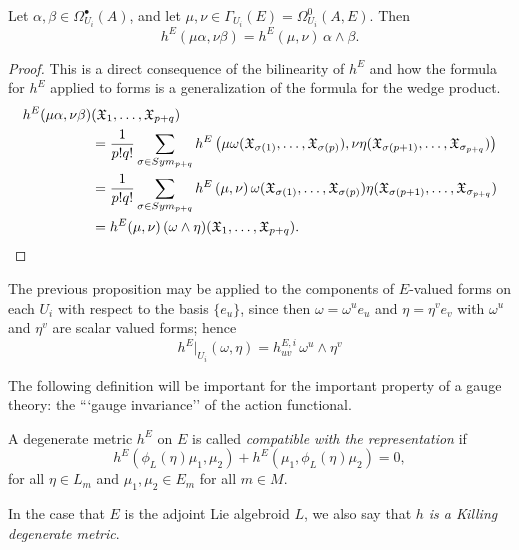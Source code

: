 \begin{proposition}
Let $\alpha, \beta \in \Omega_{U_i}^\bullet(A)$, and let $\mu, \nu \in \Gamma_{U_i}(E) = \Omega^0_{U_i}(A, E)$. Then
\begin{equation}
    h^E(\mu \alpha, \nu \beta) = h^E(\mu, \nu) \, \alpha \wedge \beta.
\end{equation}
\end{proposition}
\begin{proof}
This is a direct consequence of the bilinearity of $h^E$  and how the formula for $h^E$ applied to forms is a generalization of the formula for the wedge product.
\begin{align*}
    h^E(\mu \alpha, \nu \beta)&(\mathfrak{X}_1, \dots, \mathfrak{X}_{p+q})\\
    &=\frac{1}{p!q!} \sum_{\sigma \in Sym_{p+q}} h^E\left( \mu \omega(\mathfrak{X}_{\sigma(1)}, \dots, \mathfrak{X}_{\sigma(p)}),  \nu \eta(\mathfrak{X}_{\sigma(p+1)}, \dots, \mathfrak{X}_{\sigma_{p+q}}) \right) \\
    &= \frac{1}{p!q!} \sum_{\sigma \in Sym_{p+q}} 
        h^E\left( \mu ,  \nu  \right) 
        \omega(\mathfrak{X}_{\sigma(1)}, \dots, \mathfrak{X}_{\sigma(p)}) \eta(\mathfrak{X}_{\sigma(p+1)}, \dots, \mathfrak{X}_{\sigma_{p+q}})\\
    &= h^E(\mu, \nu) \, (\omega \wedge \eta)(\mathfrak{X}_1, \dots, \mathfrak{X}_{p+q}).
\end{align*}
\end{proof}

The previous proposition may be applied to the components of $E$-valued forms on each $U_i$ with respect to the basis $\{e_u\}$, since then $\omega = \omega^u e_u$ and $\eta = \eta^v e_v$ with $\omega^u$ and $\eta^v$ are scalar valued forms; hence
\begin{equation}\label{equationLocalhProductOfMetrics}
    h^E|_{U_i}(\omega, \eta) = h^{E,i}_{uv}\,\omega^u \wedge \eta^v 
\end{equation}

The following definition will be important for the important property of a gauge theory: the ```gauge invariance'' of the action functional.

\begin{definition}
A degenerate metric $h^E$ on $E$ is called \emph{compatible with the representation} if
\begin{equation*}
    h^E(\phi_L(\eta) \mu_1, \mu_2) + h^E(\mu_1, \phi_L(\eta)\mu_2) = 0,
\end{equation*}
for all $\eta \in L_m$ and $\mu_1, \mu_2 \in E_m$ for all $m \in M$.

In the case that $E$ is the adjoint Lie algebroid $L$, we also say that \emph{$h$ is a Killing degenerate metric}.
\end{definition}

